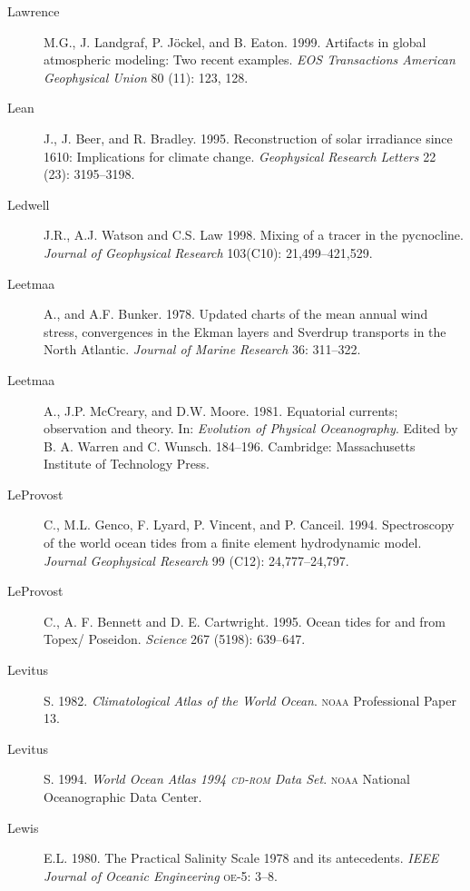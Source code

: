 \begin{description}
\item [Lawrence]M.G., J. Landgraf, P. Jöckel, and
  B. Eaton. 1999. Artifacts in global atmospheric modeling: Two recent
  examples. \textit{EOS Transactions American Geophysical Union} 80
  (11): 123, 128.

\item [Lean]J., J. Beer, and R. Bradley. 1995. Reconstruction of solar
  irradiance since 1610: Implications for climate
  change. \textit{Geophysical Research Letters} 22 (23): 3195--3198.

\item [Ledwell]J.R., A.J. Watson and C.S. Law 1998. Mixing of a tracer
  in the pycnocline. \textit{Journal of Geophysical Research}
  103(C10): 21,499--421,529.

\item[Leetmaa]A., and A.F. Bunker. 1978. Updated charts of the mean
  annual wind stress, convergences in the Ekman layers and Sverdrup
  transports in the North Atlantic. \textit{Journal of Marine
    Research} 36: 311--322.

\item[Leetmaa]A., J.P. McCreary, and D.W. Moore. 1981. Equatorial
  currents; observation and theory. In: \textit{Evolution of Physical
    Oceanography}. Edited by B. A. Warren and
  C. Wunsch. 184--196. Cambridge: Massachusetts Institute of
  Technology Press.

\item [LeProvost]C., M.L. Genco, F. Lyard, P. Vincent, and
  P. Canceil. 1994. Spectroscopy of the world ocean tides from a
  finite element hydrodynamic model. \textit{Journal Geophysical
    Research} 99 (C12): 24,777--24,797.

\item [LeProvost]C., A. F. Bennett and D. E. Cartwright. 1995. Ocean
  tides for and from Topex/ Poseidon. \textit{Science} 267 (5198):
  639--647.

\item [Levitus]S. 1982. \textit{Climatological Atlas of the World
  Ocean}. \textsc{noaa} Professional Paper 13.

\item [Levitus]S. 1994. \textit{World Ocean Atlas 1994 \textsc{cd-rom}
  Data Set}. \textsc{noaa} National Oceanographic Data Center.

\item [Lewis]E.L. 1980. The Practical Salinity Scale 1978 and its
  antecedents.  \textit{IEEE Journal of Oceanic Engineering}
  \textsc{oe}-5: 3--8.


\end{description}

